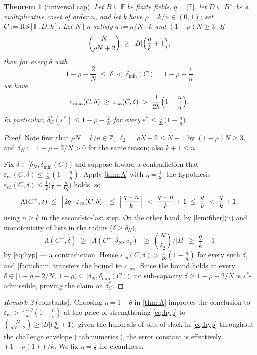 \documentclass[11pt]{article}
\newtheorem{theorem}{Theorem}[section]
\theoremstyle{definition}
\theoremstyle{remark}
\newtheorem{remark}[theorem]{Remark}
\newcommand{\F}{\mathbb{F}}
\newcommand{\B}{B}
\newcommand{\RS}{\mathrm{RS}}
\newcommand{\eca}{\varepsilon_{\mathrm{ca}}}
\newcommand{\emca}{\varepsilon_{\mathrm{mca}}}
\newcommand{\dmin}{\delta_{\min}}
\newcommand{\Lst}{\Lambda}
\begin{document}
\begin{theorem}[universal cap]\label{thm:main}
Let $\B\subseteq\F$ be finite fields, $q=|\F|$, let $D\subseteq\B^\times$ be a multiplicative coset of order $n$, and let $k$ have $\rho=k/n\in(0,1)$; set $C:=\RS[\F,D,k]$. Let $N\mid n$ satisfy $a:=n/N\mid k$ and $(1-\rho)N\ge3$. If
\begin{equation}\label{eq:hyp}
\binom{N}{\rho N+2}\;\ge\;|\B|\Bigl(\frac qk+1\Bigr),
\end{equation}
then for every $\delta$ with
\[
1-\rho-\frac2N\;\le\;\delta\;<\;\dmin(C)=1-\rho+\frac1n
\]
we have
\[
\emca(C,\delta)\;\ge\;\eca(C,\delta)\;>\;\frac1{2k}\Bigl(1-\frac nq\Bigr).
\]
In particular, $\delta^*_C(\varepsilon^*)\le1-\rho-\frac2N$ for every $\varepsilon^*\le\frac1{2k}\bigl(1-\frac nq\bigr)$.
\end{theorem}

\begin{proof}
Note first that $\rho N=k/a\in\mathbb Z$, $\ell_2=\rho N+2\le N-1$ by $(1-\rho)N\ge3$, and $\delta_N:=1-\rho-2/N>0$ for the same reason; also $k+1\le n$.

Fix $\delta\in[\delta_N,\dmin(C))$ and suppose toward a contradiction that $\eca(C,\delta)\le\frac1{2k}(1-\frac nq)$. Apply \cref{thm:A} with $\eta=\frac12$: the hypothesis $\eca(C,\delta)\le\frac12\bigl(\frac1k-\frac n{kq}\bigr)$ holds, so
\[
\Lst(C^+,\delta)\;\le\;\Bigl\lceil 2q\cdot\eca(C,\delta)\Bigr\rceil\;\le\;\Bigl\lceil\frac{q-n}k\Bigr\rceil\;<\;\frac{q-n}k+1\;\le\;\frac qk\;<\;\frac qk+1,
\]
using $n\ge k$ in the second-to-last step. On the other hand, by \cref{lem:fiber}(ii) and monotonicity of lists in the radius ($\delta\ge\delta_N$),
\[
\Lst(C^+,\delta)\;\ge\;\bigl|\Lst(C^+,\delta_N,u_z)\bigr|\;\ge\;\binom{N}{\ell_2}\Big/|\B|\;\ge\;\frac qk+1
\]
by \eqref{eq:hyp} --- a contradiction. Hence $\eca(C,\delta)>\frac1{2k}(1-\frac nq)$ for every such $\delta$, and \cref{fact:chain} transfers the bound to $\emca$. Since the bound holds at every $\delta\in[1-\rho-2/N,\,1-\rho)\subseteq[\delta_N,\dmin(C))$, no sub-capacity $\delta\ge1-\rho-2/N$ is $\varepsilon^*$-admissible, proving the claim on $\delta^*_C$.
\end{proof}

\begin{remark}[constants]\label{rem:eta}
Choosing $\eta=1-\theta$ in \cref{thm:A} improves the conclusion to $\eca>\frac{1-\theta}k(1-\frac nq)$ at the price of strengthening \eqref{eq:hyp} to $\binom N{\rho N+2}\ge|\B|\bigl(\frac q{\theta k}+1\bigr)$; given the hundreds of bits of slack in \eqref{eq:hyp} throughout the challenge envelope (\cref{tab:numerics}), the error constant is effectively $(1-o(1))/k$. We fix $\eta=\frac12$ for cleanliness.
\end{remark}
\end{document}
